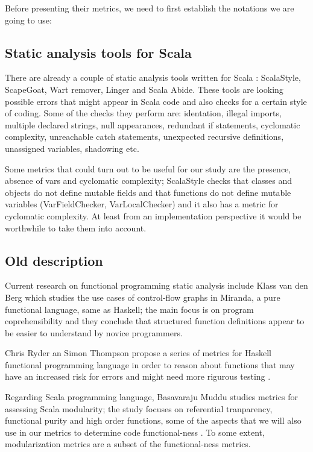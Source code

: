 \documentclass{article}
\begin{document}
Before presenting their metrics, we need to first establish the notations we are going to use: \par



\subsection {Static analysis tools for Scala}
There are already a couple of static analysis tools written for Scala : ScalaStyle, ScapeGoat, Wart remover, Linger and Scala Abide. These tools are looking possible errors that might appear in Scala code and also checks for a certain style of coding. Some of the checks they perform are: identation, illegal imports, multiple declared strings, null appearances, redundant if statements, cyclomatic complexity, unreachable catch statements, unexpected recursive definitions, unassigned variables, shadowing etc. \par

Some metrics that could turn out to be useful for our study are  the presence, absence of vars and cyclomatic complexity; ScalaStyle checks that classes and objects do not define mutable fields and that functions do not define mutable variables (VarFieldChecker, VarLocalChecker) \cite{scalastyle} and it also has a metric for cyclomatic complexity. At least from an implementation perspective it would be worthwhile to take them into account.\par

\subsection{Old description}

Current research on functional programming static analysis include Klass van den Berg \cite{DBLP:journals/infsof/BergB95} which studies the use cases of control-flow graphs in Miranda, a pure functional language, same as Haskell; the main focus is on program coprehensibility and they conclude that structured function definitions appear to be easier to understand by novice programmers. \par

Chris Ryder an Simon Thompson propose a series of metrics for Haskell functional programming language in order to reason about functions that may have an increased risk for errors and might need more rigurous testing \cite{RyderT05:TFP_2005_Intellect}. \par

Regarding Scala programming language, Basavaraju Muddu studies metrics for assessing Scala modularity; the study focuses on referential tranparency, functional purity and high order functions, some of the aspects that we will also use in our metrics to determine code functional-ness \cite{DBLP:conf/icse/MudduABP13}. To some extent, modularization metrics are a subset of the functional-ness metrics. \par
\end{document}
